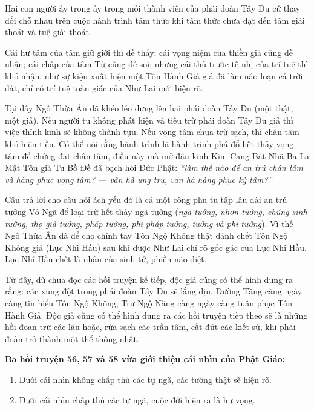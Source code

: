 Hai con người ấy trong ấy trong mỗi thành viên của phái đoàn Tây Du cứ thay đổi chỗ nhau trên cuộc hành trình tâm thức khi tâm thức chưa đạt đến tâm giải thoát và tuệ giải thoát.

Cái hư tâm của tâm giữ giới thì dễ thấy; cái vọng niệm của thiền giả cũng dễ nhận; cái chấp của tâm Từ cũng dễ soi; nhưng cái thủ trước tế nhị của trí tuệ thì khó nhận, như sự kiện xuất hiện một Tôn Hành Giả giả đã làm náo loạn cả trời đất, chỉ có trí tuệ toàn giác của Như Lai mới biện rõ.

Tại đây Ngô Thừa Ân đã khéo léo dựng lên hai phái đoàn Tây Du (một thật, một giả). Nếu người tu không phát hiện và tiêu trừ phái đoàn Tây Du giả thì việc thỉnh kinh sẽ không thành tựu. Nếu vọng tâm chưa trừ sạch, thì chân tâm khó hiện tiền. Có thể nói rằng hành trình là hành trình phá đổ hết thảy vọng tâm để chứng đạt chân tâm, điều này mà mở đầu kinh Kim Cang Bát Nhã Ba La Mật Tôn giả Tu Bồ Đề đã bạch hỏi Đức Phật: \emph{``làm thế nào để an trú chân tâm và hàng phục vọng tâm? — vân hà ưng trụ, van hà hàng phục kỳ tâm?''}

Câu trả lời cho câu hỏi ách yếu đó là cả một công phu tu tập lâu dài an trú tưởng Vô Ngã để loại trừ hết thảy ngã tưởng (\emph{ngã tưởng, nhơn tưởng, chúng sinh tưởng, thọ giả tưởng, pháp tưởng, phi pháp tưởng, tưởng và phi tưởng}). Vì thế Ngô Thừa Ân đã để cho chính tay Tôn Ngộ Không thật đánh chết Tôn Ngộ Không giả (Lục Nhĩ Hầu) sau khi được Như Lai chỉ rõ gốc gác của Lục Nhĩ Hầu. Lục Nhĩ Hầu chết là nhân của sinh tử, phiền não diệt.

Từ đây, dù chưa đọc các hồi truyện kế tiếp, độc giả cũng có thể hình dung ra rằng: các xung đột trong phái đoàn Tây Du sẽ lắng dịu, Đường Tăng càng ngày càng tin hiểu Tôn Ngộ Không; Trư Ngộ Năng càng ngày càng tuân phục Tôn Hành Giả. Độc giả cũng có thể hình dung ra các hồi truyện tiếp theo sẽ là những hồi đoạn trừ các lậu hoặc, rửa sạch các trần tâm, cắt đứt các kiết sử, khi phái đoàn trở thành một thể thống nhất.

{\bf Ba hồi truyện 56, 57 và 58 vừa giới thiệu cái nhìn của Phật Giáo:}

\begin{enumerate}[label=\itshape\alph*\upshape/]
    \item Dưới cái nhìn không chấp thủ các tự ngã, các tướng thật sẽ hiện rõ.

    \item Dưới cái nhìn chấp thủ các tự ngã, cuộc đời hiện ra là hư vọng.
\end{enumerate}

